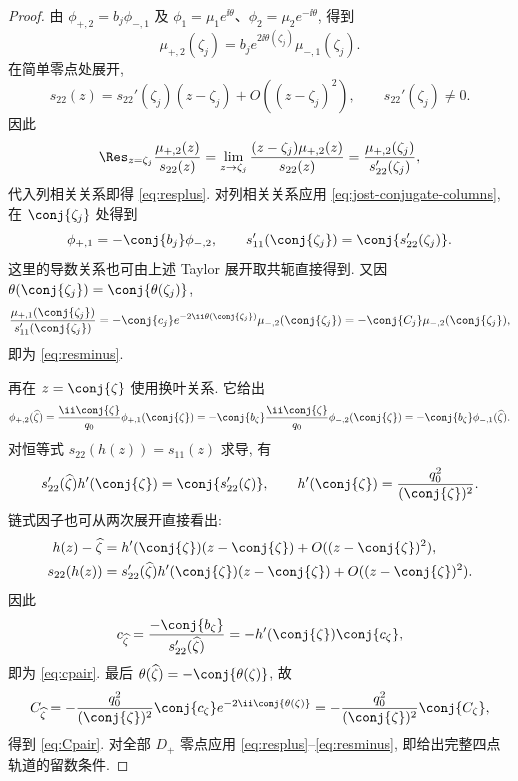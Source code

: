 \begin{proof}
由 $\phi_{+,2}=b_j\phi_{-,1}$ 及 $\phi_1=\mu_1e^{\ii\theta}$、$\phi_2=\mu_2e^{-\ii\theta}$, 得到
\[
\mu_{+,2}(\zeta_j)=b_je^{2\ii\theta(\zeta_j)}\mu_{-,1}(\zeta_j).
\]
在简单零点处展开,
\[
s_{22}(z)=s_{22}'(\zeta_j)(z-\zeta_j)+O((z-\zeta_j)^2),\qquad
s_{22}'(\zeta_j)\ne0.
\]
因此
\[
\Res_{z=\zeta_j}\dfrac{\mu_{+,2}(z)}{s_{22}(z)}
=\lim\limits_{z\to\zeta_j}\dfrac{(z-\zeta_j)\mu_{+,2}(z)}{s_{22}(z)}
=\dfrac{\mu_{+,2}(\zeta_j)}{s_{22}'(\zeta_j)},
\]
代入列相关关系即得 \eqref{eq:resplus}. 对列相关关系应用 \eqref{eq:jost-conjugate-columns}, 在 $\conj{\zeta_j}$ 处得到
\[
\phi_{+,1}=-\conj{b_j}\phi_{-,2},\qquad
s_{11}'(\conj{\zeta_j})=\conj{s_{22}'(\zeta_j)}.
\]
这里的导数关系也可由上述 Taylor 展开取共轭直接得到. 又因 $\theta(\conj{\zeta_j})=\conj{\theta(\zeta_j)}$,
\[
\dfrac{\mu_{+,1}(\conj{\zeta_j})}{s_{11}'(\conj{\zeta_j})}
=-\conj{c_j}e^{-2\ii\theta(\conj{\zeta_j})}
\mu_{-,2}(\conj{\zeta_j})
=-\conj{C_j}\mu_{-,2}(\conj{\zeta_j}),
\]
即为 \eqref{eq:resminus}.

再在 $z=\conj{\zeta}$ 使用换叶关系. 它给出
\[
\phi_{+,2}(\widehat\zeta)
=\dfrac{\ii\conj{\zeta}}{q_0}\phi_{+,1}(\conj{\zeta})
=-\conj{b_\zeta}\dfrac{\ii\conj{\zeta}}{q_0}\phi_{-,2}(\conj{\zeta})
=-\conj{b_\zeta}\phi_{-,1}(\widehat\zeta).
\]
对恒等式 $s_{22}(h(z))=s_{11}(z)$ 求导, 有
\[
s_{22}'(\widehat\zeta)h'(\conj{\zeta})=\conj{s_{22}'(\zeta)},\qquad
h'(\conj{\zeta})=\dfrac{q_0^2}{(\conj{\zeta})^2}.
\]
链式因子也可从两次展开直接看出:
\[
\begin{aligned}
h(z)-\widehat\zeta
&=h'(\conj{\zeta})(z-\conj{\zeta})+O((z-\conj{\zeta})^2),\\
s_{22}(h(z))
&=s_{22}'(\widehat\zeta)h'(\conj{\zeta})(z-\conj{\zeta})+O((z-\conj{\zeta})^2).
\end{aligned}
\]
因此
\[
c_{\widehat\zeta}
=\dfrac{-\conj{b_\zeta}}{s_{22}'(\widehat\zeta)}
=-h'(\conj{\zeta})\conj{c_\zeta},
\]
即为 \eqref{eq:cpair}. 最后 $\theta(\widehat\zeta)=-\conj{\theta(\zeta)}$, 故
\[
C_{\widehat\zeta}
=-\dfrac{q_0^2}{(\conj{\zeta})^2}\conj{c_\zeta}
e^{-2\ii\conj{\theta(\zeta)}}
=-\dfrac{q_0^2}{(\conj{\zeta})^2}\conj{C_\zeta},
\]
得到 \eqref{eq:Cpair}. 对全部 $D_+$ 零点应用 \eqref{eq:resplus}--\eqref{eq:resminus}, 即给出完整四点轨道的留数条件.
\end{proof}
